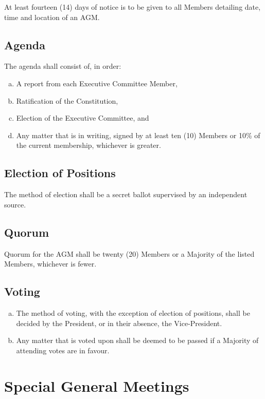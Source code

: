 \documentclass[a4paper,12pt]{article}
\begin{document}
At least fourteen (14) days of notice is to be given to all Members detailing date, time and location of an AGM.

\subsection{Agenda}

The agenda shall consist of, in order:

\begin{enumerate}[a)]
	\item A report from each Executive Committee Member,
	\item Ratification of the Constitution,
	\item Election of the Executive Committee, and
	\item Any matter that is in writing, signed by at least ten (10) Members or 10\% of the current membership, whichever is greater.
\end{enumerate}

\subsection{Election of Positions}

The method of election shall be a secret ballot supervised by an independent source.

\subsection{Quorum}

Quorum for the AGM shall be twenty (20) Members or a Majority of the listed Members, whichever is fewer.

\subsection{Voting}

\begin{enumerate}[a)]
	\item The method of voting, with the exception of election of positions, shall be decided by the President, or in their absence, the Vice-President.
	\item Any matter that is voted upon shall be deemed to be passed if a Majority of attending votes are in favour.
\end{enumerate}

\section{Special General Meetings}
\end{document}
